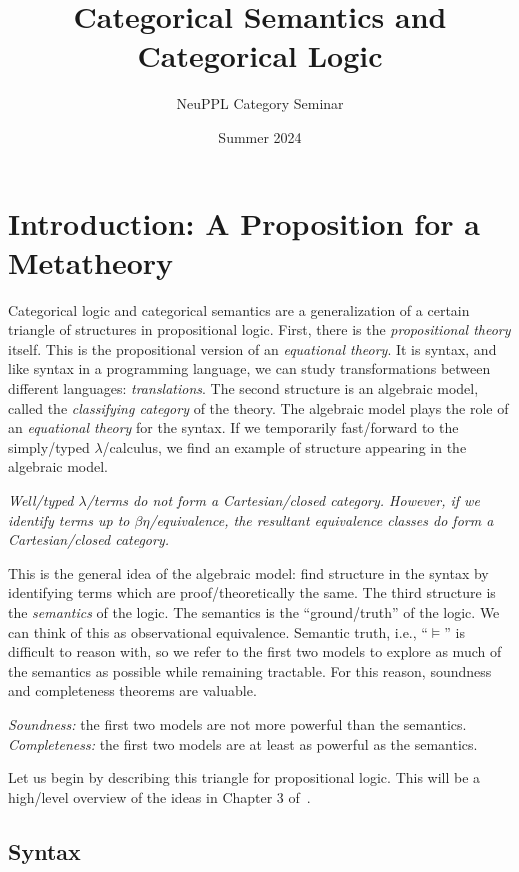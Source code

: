 \documentclass[../main.tex]{subfiles}
\begin{document}
\title{Categorical Semantics and Categorical Logic}
\author{NeuPPL Category Seminar}
\date{Summer 2024}

\makehmtitle%

\section{Introduction: A Proposition for a Metatheory}

Categorical logic and categorical semantics are a generalization of a certain
triangle of structures in propositional logic. First, there is the
\emph{propositional theory} itself. This is the propositional version of an
\emph{equational theory}. It is syntax, and like syntax in a programming
language, we can study transformations between different languages:
\emph{translations}. The second structure is an algebraic model, called the
\emph{classifying category} of the theory. The algebraic model plays the role of
an \emph{equational theory} for the syntax. If we temporarily fast\-/forward to
the simply\-/typed \(\lambda\)\-/calculus, we find an example of structure
appearing in the algebraic model.
\begin{indented}
  \emph{%
    Well\-/typed \(\lambda\)\-/terms do not form a Cartesian\-/closed
    category. However, if we identify terms up to \(\beta\eta\)\-/equivalence,
    the resultant equivalence classes do form a Cartesian\-/closed category.
  }%
\end{indented}
\noindent This is the general idea of the algebraic model: find structure in the
syntax by identifying terms which are proof\-/theoretically the same. The third
structure is the \emph{semantics} of the logic. The semantics is the
``ground\-/truth'' of the logic. We can think of this as observational
equivalence. Semantic truth, i.e., ``\(\vDash\)'' is difficult to reason with,
so we refer to the first two models to explore as much of the semantics as
possible while remaining tractable. For this reason, soundness and completeness
theorems are valuable.
\begin{indented}
  \emph{Soundness:} the first two models are not more powerful than the
  semantics.\\
  \emph{Completeness:} the first two models are at least as powerful as the
  semantics.
\end{indented}
Let us begin by describing this triangle for propositional logic. This will be a
high\-/level overview of the ideas in Chapter 3 of~\cite{Halvorson2019}.

\subsection*{Syntax}
\end{document}
